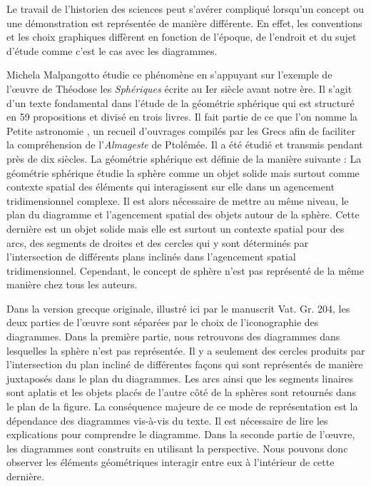 Le travail de l'historien des sciences peut s'avérer compliqué lorsqu'un concept ou une démonstration est représentée de manière différente. En effet, les conventions et les choix graphiques diffèrent en fonction de l'époque, de l'endroit et du sujet d'étude comme c'est le cas avec les diagrammes.

Michela Malpangotto étudie ce phénomène en s'appuyant sur l'exemple de l'œuvre de Théodose les \textit{Sphériques} écrite au Ier siècle avant notre ère. Il s'agit d'un texte fondamental dans l'étude de la géométrie sphérique qui est structuré en 59 propositions et divisé en trois livres. Il fait partie de ce que l'on nomme la \og Petite astronomie \fg, un recueil d'ouvrages compilés par les Grecs afin de faciliter la compréhension de l'\textit{Almageste} de Ptolémée. Il a été étudié et transmis pendant près de dix siècles. La géométrie sphérique est définie de la manière suivante : \og La géométrie sphérique étudie la sphère comme un objet solide mais surtout comme contexte spatial des éléments qui interagissent sur elle dans un agencement tridimensionnel complexe. \fg Il est alors nécessaire de mettre au même niveau, le plan du diagramme et l'agencement spatial des objets autour de la sphère. Cette dernière est un objet solide mais elle est surtout un contexte spatial pour des arcs, des segments de droites et des cercles qui y sont déterminés par l'intersection de différents plans inclinés dans l'agencement spatial tridimensionnel. Cependant, le concept de sphère n'est pas représenté de la même manière chez tous les auteurs. 

Dans la version grecque originale, illustré ici par le manuscrit Vat. Gr. 204, les deux parties de l'œuvre sont séparées par le choix de l'iconographie des diagrammes. Dans la première partie, nous retrouvons des diagrammes dans lesquelles la sphère n'est pas représentée. Il y a seulement des cercles produits par l'intersection du plan incliné de différentes façons qui sont représentés de manière juxtaposés dans le plan du diagrammes. Les arcs ainsi que les segments linaires sont aplatis et les objets placés de l'autre côté de la sphères sont retournés dans le plan de la figure. La conséquence majeure de ce mode de représentation est la dépendance des diagrammes vis-à-vis du texte. Il est nécessaire de lire les explications pour comprendre le diagramme. Dans la seconde partie de l'œuvre, les diagrammes sont construits en utilisant la perspective. Nous pouvons donc observer les éléments géométriques interagir entre eux à l'intérieur de cette dernière.  


